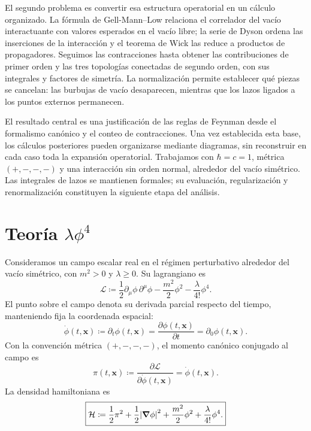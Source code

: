 \documentclass[11pt,letterpaper]{article}
\theoremstyle{definition}
\theoremstyle{definition}
\newcommand{\eqbox}[1]{\boxed{\displaystyle #1}}
\newcounter{diagrama}
\begin{document}
El segundo problema es convertir esa estructura operatorial en un cálculo
organizado. La fórmula de Gell-Mann--Low relaciona el correlador del vacío
interactuante con valores esperados en el vacío libre; la serie de Dyson
ordena las inserciones de la interacción y el teorema de Wick las reduce
a productos de propagadores. Seguimos las contracciones hasta obtener las
contribuciones de primer orden y las tres topologías conectadas de segundo
orden, con sus integrales y factores de simetría. La normalización permite
establecer qué piezas se cancelan: las burbujas de vacío desaparecen,
mientras que los lazos ligados a los puntos externos permanecen.

El resultado central es una justificación de las reglas de Feynman desde
el formalismo canónico y el conteo de contracciones. Una vez establecida
esta base, los cálculos posteriores pueden organizarse mediante diagramas,
sin reconstruir en cada caso toda la expansión operatorial. Trabajamos con
$\hbar=c=1$, métrica $(+,-,-,-)$ y una interacción sin orden normal,
alrededor del vacío simétrico. Las integrales de lazos se mantienen formales;
su evaluación, regularización y renormalización constituyen la siguiente
etapa del análisis.

\section{Teoría \texorpdfstring{$\lambda\phi^4$}{lambda phi4}}

Consideramos un campo escalar real en el régimen perturbativo alrededor
del vacío simétrico, con $m^2>0$ y $\lambda\geq0$. Su lagrangiano es
\begin{equation}
  \eqbox{\mathcal{L}
  \coloneqq\frac{1}{2}\partial_\mu\phi\,\partial^\mu\phi
  -\frac{m^2}{2}\phi^2
  -\frac{\lambda}{4!}\phi^4.}
\end{equation}
El punto sobre el campo denota su derivada parcial respecto del tiempo,
manteniendo fija la coordenada espacial:
\begin{equation}
  \dot\phi(t,\mathbf{x})
  \coloneqq\partial_t\phi(t,\mathbf{x})
  =\frac{\partial\phi(t,\mathbf{x})}{\partial t}
  =\partial_0\phi(t,\mathbf{x}).
\end{equation}
Con la convención métrica $(+,-,-,-)$, el momento canónico conjugado al campo es
\begin{equation}
  \pi(t,\mathbf{x})
  \coloneqq\frac{\partial\mathcal L}{\partial\dot\phi(t,\mathbf{x})}
  =\dot\phi(t,\mathbf{x}).
\end{equation}
La densidad hamiltoniana es
\begin{equation}
  \eqbox{\mathcal{H}
  \coloneqq\frac{1}{2}\pi^2
  +\frac{1}{2}\abs{\grad\phi}^2
  +\frac{m^2}{2}\phi^2
  +\frac{\lambda}{4!}\phi^4.}
\end{equation}
\end{document}
